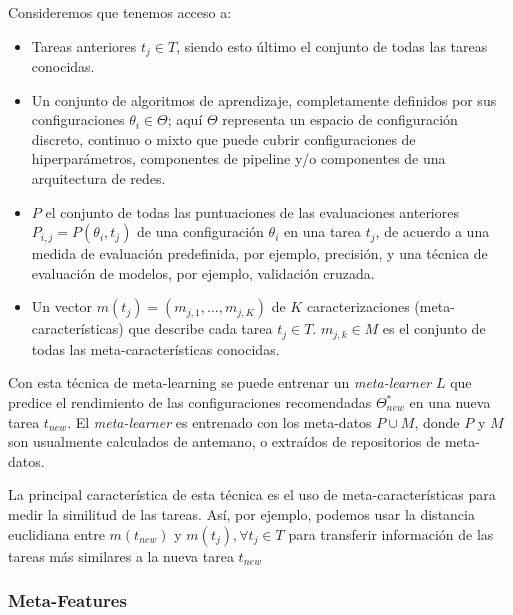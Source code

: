 \begin{definition}
Consideremos que tenemos acceso a:

\begin{itemize}
	\item Tareas anteriores $t_j \in T$, siendo esto último el conjunto de todas las tareas conocidas.
	\item Un conjunto de algoritmos de aprendizaje, completamente definidos por sus configuraciones $\theta_i \in \Theta$; aquí $\Theta$ representa un espacio de configuración discreto, continuo o mixto que puede cubrir configuraciones de hiperparámetros, componentes de pipeline y/o componentes de una arquitectura de redes.
	\item $P$ el conjunto de todas las puntuaciones de las evaluaciones anteriores $P_{i,j} = P(\theta_i, t_j)$ de una configuración $\theta_i$ en una tarea $t_j$, de acuerdo a una medida de evaluación predefinida, por ejemplo, precisión, y una técnica de evaluación de modelos, por ejemplo, validación cruzada. 
	\item Un vector $m(t_j) = (m_{j,1}, …, m_{j,K})$ de $K$ caracterizaciones (meta-características) que describe cada tarea $t_j \in T$. $m_{j,k} \in M$ es el conjunto de todas las meta-características conocidas.
\end{itemize}

Con esta técnica de meta-learning se puede entrenar un \emph{meta-learner} $L$ que predice el rendimiento de las configuraciones recomendadas $\Theta^*_{new}$ en una nueva tarea $t_{new}$. El \emph{meta-learner} es entrenado con los meta-datos $P\cup M$, donde $P$ y $M$ son usualmente calculados de antemano, o extraídos de repositorios de meta-datos.

\end{definition}

La principal característica de esta técnica es el uso de meta-características para medir la similitud de las tareas. Así, por ejemplo, podemos usar la distancia euclidiana entre $m(t_{new})$ y $m(t_j), \forall t_j \in T$ para transferir información de las tareas más similares a la nueva tarea $t_{new}$


\subsubsection{Meta-Features}

